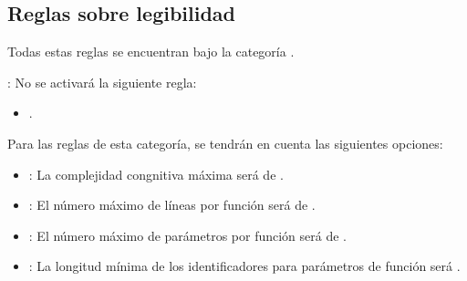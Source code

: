 \subsection{Reglas sobre legibilidad}

Todas estas reglas se encuentran bajo la categoría .

: No se activará la siguiente regla:
\begin{itemize}

\item {}.

\end{itemize}

Para las reglas de esta categoría, se tendrán en cuenta las siguientes
opciones:

\begin{itemize}

\item {}:
La complejidad congnitiva máxima será de .

\item {}:
El número máximo de líneas por función será de .

\item {}:
El número máximo de parámetros por función será de .

\item {}:
La longitud mínima de los identificadores para parámetros de función será .

\end{itemize}
